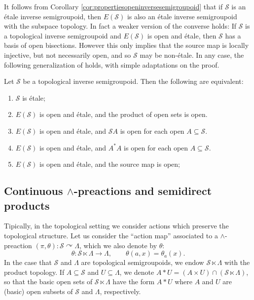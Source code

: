 It follows from Corollary \ref{cor:propertiesopeninversesemigroupoid} that if $\mathcal{S}$ is an étale inverse semigroupoid, then $E(\mathcal{S})$ is also an étale inverse semigroupoid with the subspace topology. In fact a weaker version of the converse holds: If $\mathcal{S}$ is a topological inverse semigroupoid and $E(\mathcal{S})$ is open and étale, then $\mathcal{S}$ has a basis of open bisections. However this only implies that the source map is locally injective, but not necessarily open, and so $\mathcal{S}$ may be non-étale. In any case, the following generalization of \cite[Theorem 5.18]{MR2304314} holds, with simple adaptations on the proof.

\begin{theorem}
    Let $\mathcal{S}$ be a topological inverse semigroupoid. Then the following are equivalent:
    \begin{enumerate}[label=(\arabic*)]
        \item $\mathcal{S}$ is étale;
        \item $E(\mathcal{S})$ is open and étale, and the product of open sets is open.
        \item $E(\mathcal{S})$ is open and étale, and $\mathcal{S}A$ is open for each open $A\subseteq\mathcal{S}$.
        \item $E(\mathcal{S})$ is open and étale, and $A^*A$ is open for each open $A\subseteq\mathcal{S}$.
        \item $E(\mathcal{S})$ is open and étale, and the source map is open;
    \end{enumerate}
\end{theorem}

\subsection{Continuous \texorpdfstring{$\land$}{∧}-preactions and semidirect products}\label{subsec:continuouslandpreactions}

Tipically, in the topological setting we consider actions which preserve the topological structure. Let us consider the ``action map'' associated to a $\land$-preaction $(\pi,\theta)\colon\mathcal{S}\curvearrowright\Lambda$, which we also denote by $\theta$:
\[\theta\colon\mathcal{S}\ltimes\Lambda\to\Lambda,\qquad\theta(a,x)=\theta_a(x).\]
In the case that $\mathcal{S}$ and $\Lambda$ are topological semigroupoids, we endow $\mathcal{S}\ltimes\Lambda$ with the product topology. If $A\subseteq\mathcal{S}$ and $U\subseteq\Lambda$, we denote $A\ast U=(A\times U)\cap(\mathcal{S}\ltimes\Lambda)$, so that the basic open sets of $\mathcal{S}\ltimes\Lambda$ have the form $A\ast U$ where $A$ and $U$ are (basic) open subsets of $\mathcal{S}$ and $\Lambda$, respectively.

